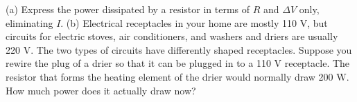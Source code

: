 (a) Express the power dissipated by a resistor in terms
        of $R$ and $\Delta V$ only, eliminating $I$.
        \answercheck\hwendpart
        (b)
        Electrical receptacles in your home are mostly 110 V, but
        circuits for electric stoves, air conditioners, and washers
        and driers are usually 220 V.  The two types of circuits
        have differently shaped receptacles.  Suppose you rewire the
        plug of a drier so that it can be plugged in to a 110 V
        receptacle.  The resistor that forms the heating element of
        the drier would normally draw 200 W.  How much power does
        it actually draw now?
        \answercheck
